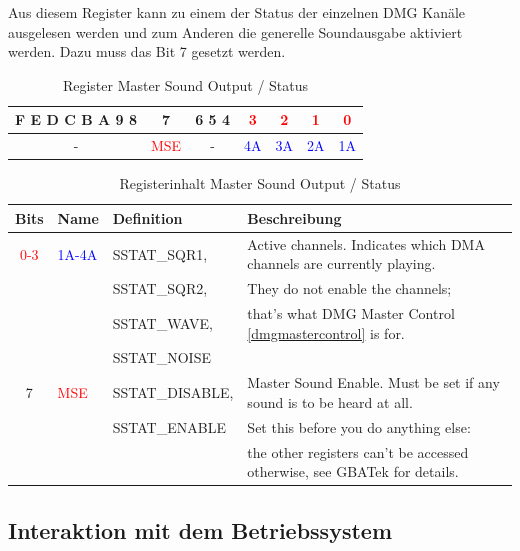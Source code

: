 \documentclass[11pt,a4paper]{scrartcl}
\begin{document}
	Aus diesem Register kann zu einem der Status der einzelnen DMG Kan\"ale ausgelesen werden und zum Anderen die generelle Soundausgabe aktiviert werden. Dazu muss das Bit 7 gesetzt werden.
	
	\begin{table}[h]
	\centering
	\begin{tabular}{| c | c | c | c | c | c | c |}
	\hline
	F E D C B A 9 8 & 7 & 6 5 4 & \textcolor{red}{3} & \textcolor{red}{2} & \textcolor{red}{1} & \textcolor{red}{0} \\
	\hline
	- & \textcolor{red}{MSE} & - & \textcolor{blue}{4A} & \textcolor{blue}{3A} & \textcolor{blue}{2A} & \textcolor{blue}{1A} \\
	\hline
	
	\end{tabular}
	\caption{Register Master Sound Output / Status}
	\label{table: MasterSoundOutputStatus}
	\end{table}
	
	\begin{table}[h]
	\centering
	\begin{tabular}{| c | l | l | l |}
	\hline
	\textbf{Bits} & \textbf{Name} & \textbf{Definition} & \textbf{Beschreibung} \\
	\hline
	\textcolor{red}{0-3} & \textcolor{blue}{1A-4A} & SSTAT\_SQR1, & Active channels. Indicates which DMA channels are currently playing.   \\
	& & SSTAT\_SQR2, & They do not enable the channels;\\
	& & SSTAT\_WAVE, & that's what DMG Master Control \ref{dmgmastercontrol} is for.\\
	& & SSTAT\_NOISE & \\
	\hline
	7 & \textcolor{red}{MSE} & SSTAT\_DISABLE, & Master Sound Enable. Must be set if any sound is to be heard at all.   \\
	& & SSTAT\_ENABLE & Set this before you do anything else: \\
	& & & the other registers can't be accessed otherwise, see GBATek for details. \\ 
	\hline
	\end{tabular}
	\caption{Registerinhalt Master Sound Output / Status}
	\label{table: MasterSoundOutputStatusContent}
	\end{table}

\clearpage

\subsection{Interaktion mit dem Betriebssystem}
\end{document}
